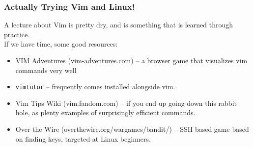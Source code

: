 \documentclass{beamer}
\begin{document}
\begin{frame}
  \frametitle{Actually Trying Vim and Linux!}
  A lecture about Vim is pretty dry, and is something that is learned through practice.\\
  If we have time, some good resources:
  \begin{itemize}
    \item VIM Adventures (vim-adventures.com) -- a browser game that visualizes vim commands very well
    \item \texttt{vimtutor} -- frequently comes installed alongside vim.
    \item Vim Tips Wiki (vim.fandom.com) -- if you end up going down this rabbit hole, as plenty examples of surprisingly efficient commands.
    \item Over the Wire (overthewire.org/wargames/bandit/) -- SSH based game based on finding keys, targeted at Linux beginners.
  \end{itemize}
\end{frame}
\end{document}
